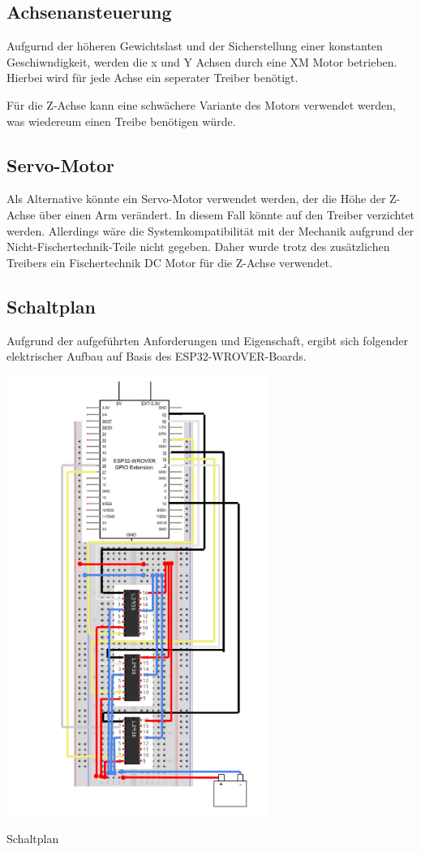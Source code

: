 \documentclass[conference,compsoc,final,a4paper]{IEEEtran}
\begin{document}
\subsection{Achsenansteuerung}

Aufgurnd der höheren Gewichtslast und der Sicherstellung einer konstanten Geschiwndigkeit, werden die x und Y Achsen durch eine XM Motor betrieben.
Hierbei wird für jede Achse ein seperater Treiber benötigt.

Für die Z-Achse kann eine schwächere Variante des Motors verwendet werden, was wiedereum einen Treibe benötigen würde.

\subsection{Servo-Motor}

Als Alternative könnte ein Servo-Motor verwendet werden, der die Höhe der Z-Achse über einen Arm verändert. 
In diesem Fall könnte auf den Treiber verzichtet werden. Allerdings wäre die Systemkompatibilität mit der Mechanik aufgrund der Nicht-Fischertechnik-Teile nicht gegeben. 
Daher wurde trotz des zusätzlichen Treibers ein Fischertechnik DC Motor für die Z-Achse verwendet.

\subsection{Schaltplan}

Aufgrund der aufgeführten Anforderungen und Eigenschaft, ergibt sich folgender elektrischer Aufbau auf Basis des ESP32-WROVER-Boards.
\begin{center}
\includegraphics[width=8.5cm]{../images/schaltplan.png}
\caption{Schaltplan}
\label{Elektrik:Schaltplan}
\end{center}
\end{document}
